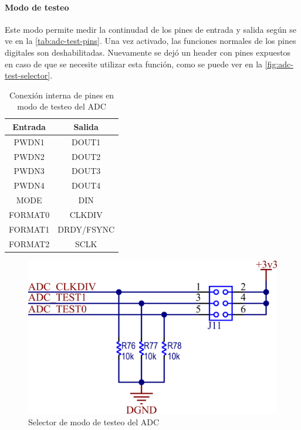 \documentclass[titlepage, 12pt]{article}
\begin{document}
\paragraph{Modo de testeo}
Este modo permite medir la continudad de los pines de entrada y salida según se ve en la \autoref{tab:adc-test-pins}. Una vez activado, las funciones normales de los pines digitales son deshabilitadas. Nuevamente se dejó un header con pines expuestos en caso de que se necesite utilizar esta función, como se puede ver en la \autoref{fig:adc-test-selector}.

    \begin{table}[!htbp]
        \centering
        \begin{tabular}{|c|c|}
        \hline
        \textbf{Entrada}                 & \textbf{Salida}                 \\ \hline
        PWDN1                            & DOUT1                           \\ \hline
        PWDN2                            & DOUT2                           \\ \hline
        PWDN3                            & DOUT3                           \\ \hline
        PWDN4                            & DOUT4                           \\ \hline
        MODE                             & DIN                             \\ \hline
        FORMAT0                          & CLKDIV                          \\ \hline
        FORMAT1                          & DRDY/FSYNC                      \\ \hline
        FORMAT2                          & SCLK                            \\ \hline
        \end{tabular}
        \caption{Conexión interna de pines en modo de testeo del ADC}
        \label{tab:adc-test-pins}
    \end{table}

    \begin{figure}[!htbp]
        \centering
        \includegraphics[scale=1.5]{images/adc-test-selector.png}
        \caption{Selector de modo de testeo del ADC}
        \label{fig:adc-test-selector}
    \end{figure}
\end{document}
